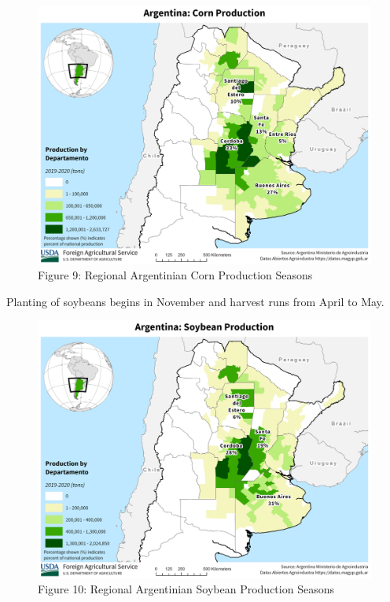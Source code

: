 \documentclass[
]{book}
\begin{document}
\begin{figure}
\centering
\includegraphics{assets/Argentina_Departments_Corn.png}
\caption{Figure 9: Regional Argentinian Corn Production Seasons}
\end{figure}

Planting of soybeans begins in November and harvest runs from April to May.

\begin{figure}
\centering
\includegraphics{assets/Argentina_Departments_Soybean.png}
\caption{Figure 10: Regional Argentinian Soybean Production Seasons}
\end{figure}
\end{document}
